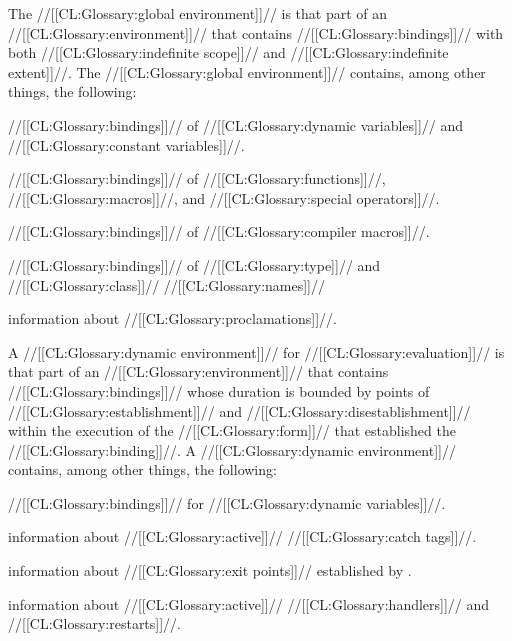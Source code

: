 
The //[[CL:Glossary:global environment]]// is that part of an //[[CL:Glossary:environment]]// that contains //[[CL:Glossary:bindings]]// with both //[[CL:Glossary:indefinite scope]]//  and //[[CL:Glossary:indefinite extent]]//. The //[[CL:Glossary:global environment]]// contains, among other things, the following:

\beginlist \item{\bull} //[[CL:Glossary:bindings]]// of //[[CL:Glossary:dynamic variables]]// and //[[CL:Glossary:constant variables]]//. \item{\bull} //[[CL:Glossary:bindings]]// of //[[CL:Glossary:functions]]//, //[[CL:Glossary:macros]]//, and //[[CL:Glossary:special operators]]//. \item{\bull}%
 //[[CL:Glossary:bindings]]// of //[[CL:Glossary:compiler macros]]//.

\item{\bull} //[[CL:Glossary:bindings]]// of //[[CL:Glossary:type]]// and //[[CL:Glossary:class]]// //[[CL:Glossary:names]]// \item{\bull} information about //[[CL:Glossary:proclamations]]//. \endlist

\endsubsubsection%


A //[[CL:Glossary:dynamic environment]]// for //[[CL:Glossary:evaluation]]// is that part of an //[[CL:Glossary:environment]]// that contains //[[CL:Glossary:bindings]]// whose duration is bounded by points of //[[CL:Glossary:establishment]]// and //[[CL:Glossary:disestablishment]]//  within the execution of the //[[CL:Glossary:form]]// that established the //[[CL:Glossary:binding]]//. A //[[CL:Glossary:dynamic environment]]// contains, among other things, the following:

\beginlist \item{\bull} //[[CL:Glossary:bindings]]// for //[[CL:Glossary:dynamic variables]]//. \item{\bull} information about //[[CL:Glossary:active]]// //[[CL:Glossary:catch tags]]//. \item{\bull} information about //[[CL:Glossary:exit points]]// established by . \item{\bull} information about //[[CL:Glossary:active]]// //[[CL:Glossary:handlers]]// and //[[CL:Glossary:restarts]]//. \endlist

